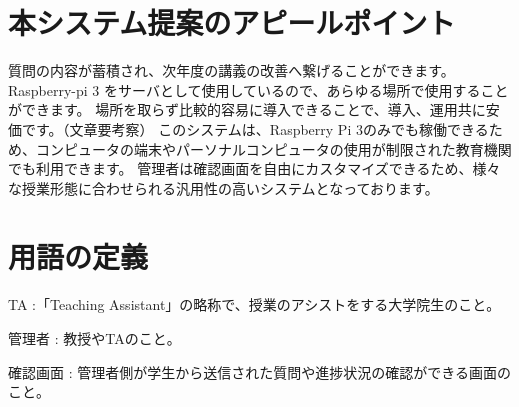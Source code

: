 \documentclass[a4j,titlepage]{ujarticle}
\begin{document}
\section{本システム提案のアピールポイント}
質問の内容が蓄積され、次年度の講義の改善へ繋げることができます。
Raspberry-pi 3 をサーバとして使用しているので、あらゆる場所で使用することができます。
場所を取らず比較的容易に導入できることで、導入、運用共に安価です。（文章要考察）
このシステムは、Raspberry Pi 3のみでも稼働できるため、コンピュータの端末やパーソナルコンピュータの使用が制限された教育機関でも利用できます。
管理者は確認画面を自由にカスタマイズできるため、様々な授業形態に合わせられる汎用性の高いシステムとなっております。


\section{用語の定義}
TA :「Teaching Assistant」の略称で、授業のアシストをする大学院生のこと。

管理者 : 教授やTAのこと。

確認画面 : 管理者側が学生から送信された質問や進捗状況の確認ができる画面のこと。


\newpage
\end{document}
